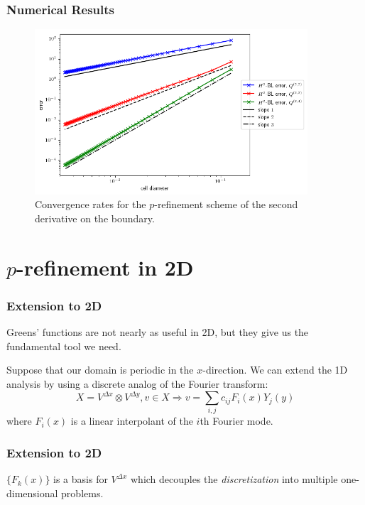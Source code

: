 \documentclass[8pt]{beamer}
\begin{document}
\begin{frame}
    \frametitle{Numerical Results}
    \begin{figure}
        \centering
        \includegraphics[width=4in]{Pictures/oned-cdr-2-h2-errors.png}

        \caption{Convergence rates for the \(p\)-refinement scheme of the second
        derivative on the boundary.}
    \end{figure}
\end{frame}

\section{\(p\)-refinement in 2D}
    \begin{frame}
        \frametitle{Extension to 2D}
        Greens' functions are not nearly as useful in 2D, but they give us the
        fundamental tool we need.

        Suppose that our domain is periodic in the \(x\)-direction. We can
        extend the 1D analysis by using a discrete analog of the Fourier
        transform:
        \begin{equation*}
            X = V^{\Delta x} \otimes V^{\Delta y},
            v \in X \Rightarrow
            v = \sum_{i,j} c_{ij} F_i(x) Y_j(y)
        \end{equation*}
        where \(F_i(x)\) is a linear interpolant of the \(i\)th Fourier mode.
    \end{frame}

    \begin{frame}
        \frametitle{Extension to 2D}
        \begin{center}
            \(\{F_k(x)\}\) is a basis for \(V^{\Delta x}\) which decouples the
            \emph{discretization} into multiple one-dimensional problems.
        \end{center}
    \end{frame}
\end{document}
